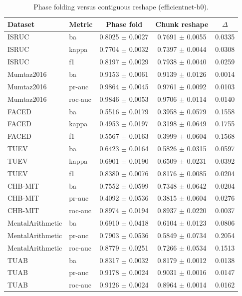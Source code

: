 \begin{table}[tbp]\centering\scriptsize\caption{Phase folding versus contiguous reshape (efficientnet-b0).}\begin{tabular}{@{}l l c c c@{}}\toprule Dataset & Metric & Phase fold & Chunk reshape & $\Delta$ \\ \midrule
ISRUC & ba & 0.8025 $\pm$ 0.0027 & 0.7691 $\pm$ 0.0055 & 0.0335 \\
ISRUC & kappa & 0.7704 $\pm$ 0.0032 & 0.7397 $\pm$ 0.0044 & 0.0308 \\
ISRUC & f1 & 0.8197 $\pm$ 0.0029 & 0.7938 $\pm$ 0.0040 & 0.0259 \\
Mumtaz2016 & ba & 0.9153 $\pm$ 0.0061 & 0.9139 $\pm$ 0.0126 & 0.0014 \\
Mumtaz2016 & pr-auc & 0.9864 $\pm$ 0.0045 & 0.9761 $\pm$ 0.0092 & 0.0103 \\
Mumtaz2016 & roc-auc & 0.9846 $\pm$ 0.0053 & 0.9706 $\pm$ 0.0114 & 0.0140 \\
FACED & ba & 0.5516 $\pm$ 0.0179 & 0.3958 $\pm$ 0.0579 & 0.1558 \\
FACED & kappa & 0.4953 $\pm$ 0.0197 & 0.3198 $\pm$ 0.0649 & 0.1755 \\
FACED & f1 & 0.5567 $\pm$ 0.0163 & 0.3999 $\pm$ 0.0604 & 0.1568 \\
TUEV & ba & 0.6423 $\pm$ 0.0164 & 0.5826 $\pm$ 0.0315 & 0.0597 \\
TUEV & kappa & 0.6901 $\pm$ 0.0190 & 0.6509 $\pm$ 0.0231 & 0.0392 \\
TUEV & f1 & 0.8380 $\pm$ 0.0076 & 0.8176 $\pm$ 0.0085 & 0.0204 \\
CHB-MIT & ba & 0.7552 $\pm$ 0.0599 & 0.7348 $\pm$ 0.0642 & 0.0204 \\
CHB-MIT & pr-auc & 0.4092 $\pm$ 0.0536 & 0.3815 $\pm$ 0.0604 & 0.0276 \\
CHB-MIT & roc-auc & 0.8974 $\pm$ 0.0194 & 0.8937 $\pm$ 0.0220 & 0.0037 \\
MentalArithmetic & ba & 0.6910 $\pm$ 0.0418 & 0.6104 $\pm$ 0.0123 & 0.0806 \\
MentalArithmetic & pr-auc & 0.7903 $\pm$ 0.0536 & 0.5849 $\pm$ 0.0734 & 0.2054 \\
MentalArithmetic & roc-auc & 0.8779 $\pm$ 0.0251 & 0.7266 $\pm$ 0.0534 & 0.1513 \\
TUAB & ba & 0.8317 $\pm$ 0.0032 & 0.8179 $\pm$ 0.0012 & 0.0138 \\
TUAB & pr-auc & 0.9178 $\pm$ 0.0024 & 0.9031 $\pm$ 0.0016 & 0.0147 \\
TUAB & roc-auc & 0.9126 $\pm$ 0.0024 & 0.8964 $\pm$ 0.0014 & 0.0162 \\

\end{tabular}
\end{table}
